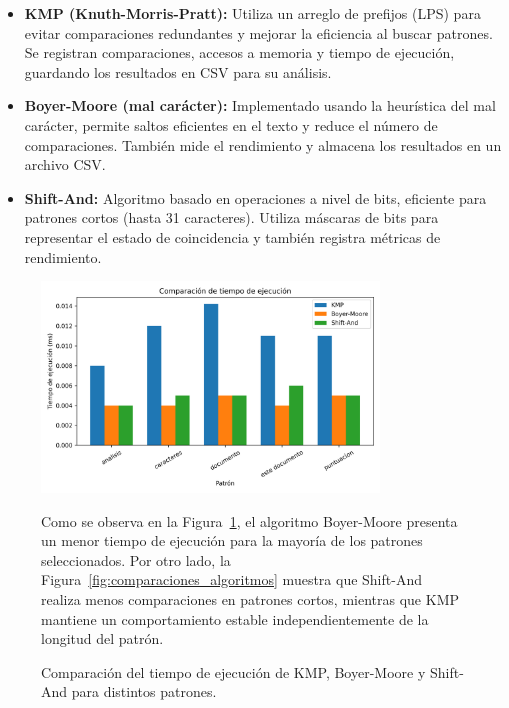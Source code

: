\documentclass[9pt,letterpaper,onecolumn]{rho-class/rho}
\begin{document}
\begin{itemize}
    \item \textbf{KMP (Knuth-Morris-Pratt):}  
    Utiliza un arreglo de prefijos (LPS) para evitar comparaciones redundantes y mejorar la eficiencia al buscar patrones. Se registran comparaciones, accesos a memoria y tiempo de ejecución, guardando los resultados en CSV para su análisis.

    \item \textbf{Boyer-Moore (mal carácter):}  
    Implementado usando la heurística del mal carácter, permite saltos eficientes en el texto y reduce el número de comparaciones. También mide el rendimiento y almacena los resultados en un archivo CSV.

    \item \textbf{Shift-And:}  
    Algoritmo basado en operaciones a nivel de bits, eficiente para patrones cortos (hasta 31 caracteres). Utiliza máscaras de bits para representar el estado de coincidencia y también registra métricas de rendimiento.
\end{itemize}

\begin{figure}[ht]
    \centering
    \includegraphics[width=0.8\textwidth]{tiempos_algoritmos.png}
    \caption{Comparación del tiempo de ejecución de KMP, Boyer-Moore y Shift-And para distintos patrones.}
    \label{fig:tiempos_algoritmos}
    Como se observa en la Figura~\ref{fig:tiempos_algoritmos}, el algoritmo Boyer-Moore presenta un menor tiempo de ejecución para la mayoría de los patrones seleccionados. Por otro lado, la Figura~\ref{fig:comparaciones_algoritmos} muestra que Shift-And realiza menos comparaciones en patrones cortos, mientras que KMP mantiene un comportamiento estable independientemente de la longitud del patrón.
\end{figure}
\end{document}
